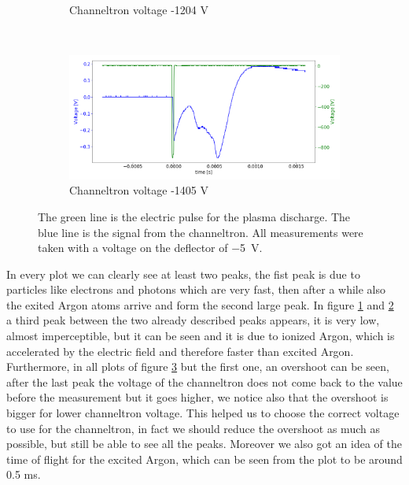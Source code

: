 \documentclass[a4paper,10pt]{article}
\begin{document}
\begin{figure}[H]
\begin{subfigure}[t]{0.45 \textwidth}
    \caption{Channeltron voltage -1204 V}\label{channeltron3}
  \end{subfigure}
  ~
  \begin{subfigure}[t]{0.45 \textwidth}
    \centering
    \includegraphics[width=\textwidth]{channeltron5}
    \caption{Channeltron voltage -1405 V}\label{channeltron4}
  \end{subfigure}
  \caption{The green line is the electric pulse for the plasma discharge. The blue line is the signal from the channeltron. All measurements were taken with a voltage on the deflector of \SI{-5}{\volt}. }
  \label{channeltron}
\end{figure}
In every plot we can clearly see at least two peaks, the fist peak is due to particles like electrons and photons which are very fast, then after a while also the exited Argon atoms arrive and form the second large peak. In figure \ref{channeltron3} and \ref{channeltron4} a third peak between the two already described peaks appears, it is very low, almost imperceptible, but it can be seen and it is due to ionized Argon, which is accelerated by the electric field and therefore faster than excited Argon. Furthermore, in all plots of figure \ref{channeltron} but the first one, an overshoot can be seen, after the last peak the voltage of the channeltron does not come back to the value before the measurement but it goes higher, we notice also that the overshoot is bigger for lower channeltron voltage. This helped us to choose the correct voltage to use for the channeltron, in fact we should reduce the overshoot as much as possible, but still be able to see all the peaks. Moreover we also got an idea of the time of flight for the excited Argon, which can be seen from the plot to be around 0.5 ms.
\end{document}
